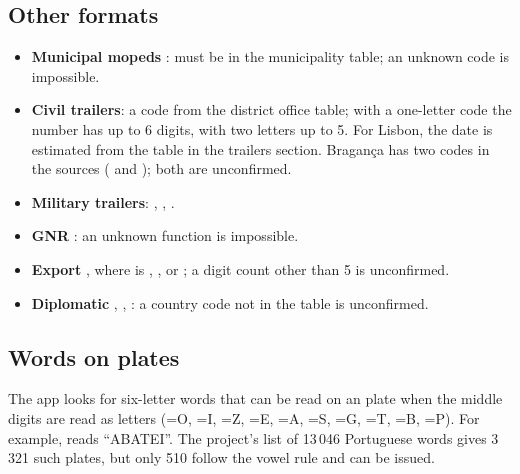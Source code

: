 \subsection{Other formats}
\begin{itemize}
  \item \textbf{Municipal mopeds} :  must be in the
        municipality table; an unknown code is impossible.
  \item \textbf{Civil trailers}: a code from the district office table; with a
        one-letter code the number has up to 6 digits, with two letters up to 5.
        For Lisbon, the date is estimated from the table in the trailers section.
        Bragança has two codes in the sources ( and ); both
        are unconfirmed.
  \item \textbf{Military trailers}: , , .
  \item \textbf{GNR} : an unknown function is impossible.
  \item \textbf{Export} , where  is , ,
         or ; a digit count other than 5 is unconfirmed.
  \item \textbf{Diplomatic} , ,
        : a country code not in the table is unconfirmed.
\end{itemize}

\subsection{Words on plates}

The app looks for six-letter words that can be read on an  plate
when the middle digits are read as letters (=O, =I,
=Z, =E, =A, =S, =G, =T,
=B, =P). For example,  reads “ABATEI”. The
project's list of 13\,046 Portuguese words gives 3\,321 such plates, but only 510
follow the vowel rule and can be issued.
